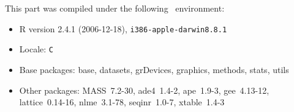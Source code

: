 \documentclass{article}
\begin{document}
This part was compiled under the following \Rlogo{}~environment:

\begin{itemize}
  \item R version 2.4.1 (2006-12-18), \verb|i386-apple-darwin8.8.1|
  \item Locale: \verb|C|
  \item Base packages: base, datasets, grDevices, graphics, methods,
    stats, utils
  \item Other packages: MASS~7.2-30, ade4~1.4-2, ape~1.9-3,
    gee~4.13-12, lattice~0.14-16, nlme~3.1-78, seqinr~1.0-7,
    xtable~1.4-3
\end{itemize}


\clearpage
{}


\end{document}
